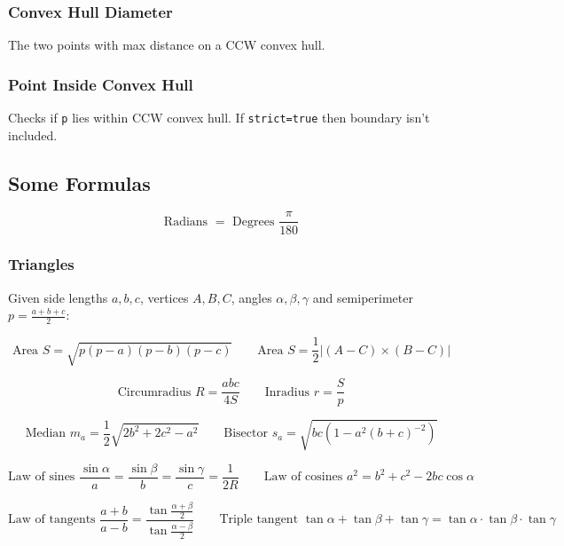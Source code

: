 \subsubsection{Convex Hull Diameter}

The two points with max distance on a CCW convex hull.

\subsubsection{Point Inside Convex Hull}

Checks if \verb|p| lies within CCW convex hull. If \verb|strict=true| then boundary isn't included.


\subsection{Some Formulas}

$$
\text{Radians } = \text{ Degrees } \frac{\pi}{180}
$$

\subsubsection{Triangles}

Given side lengths $a, b, c$, vertices $A, B, C$, angles $\alpha, \beta, \gamma$ and semiperimeter $p = \frac{a + b + c}{2}$:

$$
\text{Area } S = \sqrt{p(p-a)(p-b)(p-c)} \hspace{2em}
\text{Area } S = \frac12 | (A - C) \times (B - C) |
$$

$$
\text{Circumradius } R = \frac{abc}{4S} \hspace{2em}
\text{Inradius } r = \frac{S}{p}
$$

$$
\text{Median } m_a = \frac12 \sqrt{2b^2 + 2c^2 - a^2}  \hspace{2em}
\text{Bisector } s_a = \sqrt{bc\left(1 - a^2\left(b+c\right)^{-2}\right)}
$$

$$
\text{Law of sines } \frac{\sin\alpha}{a} = \frac{\sin\beta}{b} = \frac{\sin\gamma}{c} = \frac1{2R} \hspace{2em}
\text{Law of cosines } a^2 = b^2 + c^2 - 2bc\cos\alpha
$$

$$
\text{Law of tangents } \frac{a + b}{a - b} = \frac{\tan\frac{\alpha + \beta}{2}}{\tan\frac{\alpha - \beta}{2}} \hspace{2em}
\text{Triple tangent }
\tan\alpha + \tan\beta + \tan\gamma = \tan\alpha \cdot \tan\beta \cdot \tan\gamma
$$


